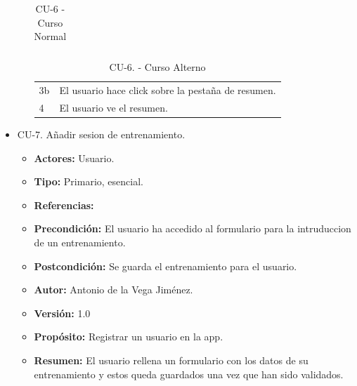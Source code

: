 \begin{itemize}
\begin{itemize}
\begin{table}[H]
\begin{tabularx}{\textwidth}{|l|X|l|X|}
      \end{tabularx}
      \caption{CU-6 - Curso Normal}
      \label{my-label}
    \end{table}
    \begin{table}[H]
      \centering
      \begin{tabularx}{\textwidth}{|l|X|}
       \hline
       \rowcolor[HTML]{C0C0C0} 
       \multicolumn{2}{|l|}{\cellcolor[HTML]{C0C0C0}Curso Alterno} \\ \hline
       \rowcolor[HTML]{FFFFFF} 
              3b                      & El usuario hace click sobre la pestaña de resumen.                            \\ \hline
              4                     & El usuario ve el resumen.                            \\ \hline
      \end{tabularx}
      \caption{CU-6. - Curso Alterno}
      \label{my-label}
    \end{table}
  \end{itemize}
  \item CU-7. Añadir sesion de entrenamiento.
  \begin{itemize}
    \item \textbf{Actores:} Usuario.
    \item \textbf{Tipo:} Primario, esencial.
    \item \textbf{Referencias:}
    \item \textbf{Precondición:} El usuario ha accedido al formulario para la intruduccion de un entrenamiento.
    \item \textbf{Postcondición:} Se guarda el entrenamiento para el usuario.
    \item \textbf{Autor:} Antonio de la Vega Jiménez.
    \item \textbf{Versión:} 1.0
    \item \textbf{Propósito:} Registrar un usuario en la app.
    \item \textbf{Resumen:} El usuario rellena un formulario con los datos de su entrenamiento y estos queda guardados una vez que han sido validados.
    \begin{table}[H]

\end{table}
\end{itemize}
\end{itemize}
